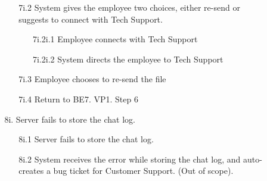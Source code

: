 \documentclass[]{article}
\begin{document}
\begin{enumerate}[{\bf BE1.}]
\begin{enumerate}[{\bf BE7.}]
\begin{enumerate}
\begin{enumerate}
                        \item[7i.2] System gives the employee two choices, either re-send or suggests to connect with Tech Support. 
			\begin{enumerate}
   				\item[7i.2i.1] Employee connects with Tech Support
       				\item[7i.2i.2] System directs the employee to Tech Support
	   		\end{enumerate}
	   		\item[7i.3]Employee chooses to re-send the file
    			\item[7i.4] Return to BE7. VP1. Step 6
                    \end{enumerate}
                    \item[8i.] Server fails to store the chat log.
                    \begin{enumerate}
                        \item[8i.1] Server fails to store the chat log.
                        \item[8i.2] System receives the error while storing the chat log, and auto-creates a bug ticket for Customer Support. (Out of scope).
                    \end{enumerate}
                \end{enumerate}
\end{enumerate}




\end{enumerate}
\end{document}
